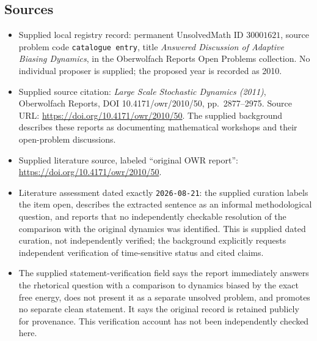 \documentclass[11pt]{article}
\begin{document}
\subsection{Sources}
\begin{itemize}
\item Supplied local registry record: permanent UnsolvedMath ID \(30001621\), source problem code \texttt{catalogue entry}, title \emph{Answered Discussion of Adaptive Biasing Dynamics}, in the Oberwolfach Reports Open Problems collection. No individual proposer is supplied; the proposed year is recorded as 2010.
\item Supplied source citation: \emph{Large Scale Stochastic Dynamics (2011)}, Oberwolfach Reports, DOI 10.4171/owr/2010/50, pp.\ 2877--2975. Source URL: \url{https://doi.org/10.4171/owr/2010/50}. The supplied background describes these reports as documenting mathematical workshops and their open-problem discussions.
\item Supplied literature source, labeled ``original OWR report'': \url{https://doi.org/10.4171/owr/2010/50}.
\item Literature assessment dated exactly \texttt{2026-08-21}: the supplied curation labels the item open, describes the extracted sentence as an informal methodological question, and reports that no independently checkable resolution of the comparison with the original dynamics was identified. This is supplied dated curation, not independently verified; the background explicitly requests independent verification of time-sensitive status and cited claims.
\item The supplied statement-verification field says the report immediately answers the rhetorical question with a comparison to dynamics biased by the exact free energy, does not present it as a separate unsolved problem, and promotes no separate clean statement. It says the original record is retained publicly for provenance. This verification account has not been independently checked here.
\end{itemize}
\end{document}
